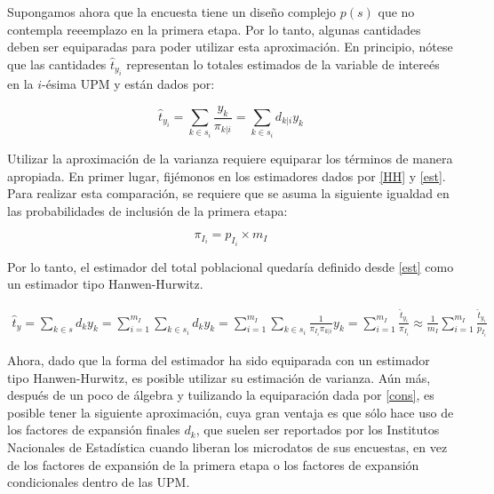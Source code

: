 Supongamos ahora que la encuesta tiene un diseño complejo \(p(s)\) que no contempla reeemplazo en la primera etapa. Por lo tanto, algunas cantidades deben ser equiparadas para poder utilizar esta aproximación. En principio, nótese que las cantidades \(\hat{t}_{y_i}\) representan lo totales estimados de la variable de intereés en la \(i\)-ésima UPM y están dados por:

\begin{equation}
\hat{t}_{y_i} = \sum_{k \in s_i} \frac{y_k}{\pi_{k|i}}
= \sum_{k \in s_i} d_{k|i} y_k 
\end{equation}

Utilizar la aproximación de la varianza requiere equiparar los términos de manera apropiada. En primer lugar, fijémonos en los estimadores dados por \eqref{HH} y \eqref{est}. Para realizar esta comparación, se requiere que
se asuma la siguiente igualdad en las probabilidades de inclusión de la primera etapa:

\begin{equation}
\label{cons}
\pi_{I_i} = p_{I_i} \times m_I 
\end{equation}

Por lo tanto, el estimador del total poblacional quedaría definido desde \eqref{est} como un estimador tipo Hanwen-Hurwitz.

\begin{align*}
\hat{t}_{y} =\sum_{k\in s} d_k y_k  
= \sum_{i=1}^{m_I}\sum_{k \in s_i} d_k y_k 
= \sum_{i=1}^{m_I}\sum_{k \in s_i} \frac{1}{\pi_{I_i} \pi_{k|i}} y_k 
= \sum_{i=1}^{m_I}\frac{\hat{t}_{y_i}}{\pi_{I_i}} 
\approx \frac{1}{m_I}\sum_{i=1}^{m_I}\frac{\hat{t}_{y_i}}{p_{I_i}}
\end{align*}

Ahora, dado que la forma del estimador ha sido equiparada con un estimador tipo Hanwen-Hurwitz, es posible utilizar su estimación de varianza. Aún más, después de un poco de álgebra y tuilizando la equiparación dada por \eqref{cons}, es posible tener la siguiente aproximación, cuya gran ventaja es que sólo hace uso de los factores de expansión finales \(d_k\), que suelen ser reportados por los Institutos Nacionales de Estadística cuando liberan los microdatos de sus encuestas, en vez de los factores de expansión de la primera etapa o los factores de expansión condicionales dentro de las UPM.

